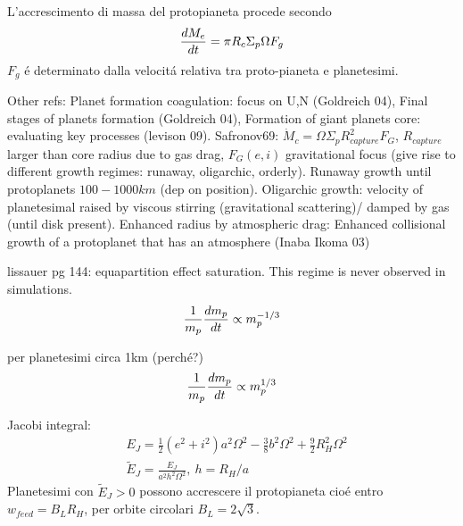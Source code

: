 L'accrescimento di massa del protopianeta procede secondo
\begin{equation}
\TDy{t}{M_e}=\pi R_c\Sigma_p\Omega F_g
\end{equation}
$F_g$ \'e determinato dalla velocit\'a relativa tra proto-pianeta e planetesimi.

\begin{workout}
Other refs: Planet formation coagulation: focus on U,N (Goldreich 04), Final stages of planets formation (Goldreich 04), Formation of giant planets core: evaluating key processes (levison 09).
Safronov69: $\dot{M}_c=\Omega\Sigma_pR^2_{capture}F_G$, $R_{capture}$ larger than core radius due to gas drag, $F_G(e,i)$ gravitational focus (give rise to different growth regimes: runaway, oligarchic, orderly).
Runaway growth until protoplanets $100-1000km$ (dep on position).
Oligarchic growth: velocity of planetesimal raised by viscous stirring (gravitational scattering)/ damped by gas (until disk present).
Enhanced radius by atmospheric drag: Enhanced collisional growth of a protoplanet that has an atmosphere (Inaba Ikoma 03)
\end{workout}

\begin{workout}
lissauer pg 144: equapartition effect saturation. This regime is never observed in simulations.
\begin{equation}
\frac{1}{m_p}\TDy{t}{m_p}\propto m_p\expy{-1/3}
\end{equation}
\end{workout}

\begin{workout}
per planetesimi circa 1km (perch\'e?)
\begin{equation}
\frac{1}{m_p}\TDy{t}{m_p}\propto m_p\expy{1/3}
\end{equation}
\end{workout}

\begin{workout}
Jacobi integral:
\begin{align}
&E_J=\frac{1}{2}(e^2+i^2)a^2\Omega^2-\frac{3}{8}b^2\Omega^2+\frac{9}{2}R_H^2\Omega^2\\
&\tilde{E}_J=\frac{E_J}{a^2h^2\Omega^2},\ h=R_H/a
\end{align}
Planetesimi con $\tilde{E}_J>0$ possono accrescere il protopianeta  cio\'e entro $w_{feed}=B_LR_H$, per orbite circolari $B_L=2\sqrt{3 }$.
\end{workout}

